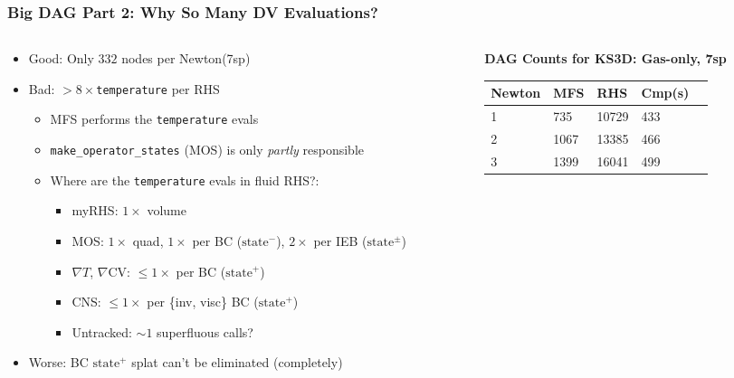 \begin{frame}\frametitle{Big DAG Part 2: Why So Many DV Evaluations?}
\begin{columns}[T, onlytextwidth] %
    \begin{column}{0.48\textwidth}
        \begin{itemize}
          \item Good: Only $332$ nodes per Newton(7sp)
          \item Bad: $>8\times$\texttt{temperature} per RHS
          \begin{itemize}
          \item MFS performs the \texttt{temperature} evals
          \item \texttt{make\_operator\_states} (MOS) is only \textit{partly} responsible
          \item Where are the \texttt{temperature} evals in fluid RHS?:
          \begin{itemize}
          \item myRHS: $1\times$ volume
          \item MOS: $1\times$ quad, $1\times$ per BC ($\text{state}^{-}$), $2\times$ per IEB ($\text{state}^{\pm}$)
          \item $\nabla{T}$, $\nabla{\text{CV}}$: $\le1\times$ per BC ($\text{state}^+$)
          \item CNS: $\le1\times$ per \{inv, visc\} BC ($\text{state}^+$)
          \item Untracked: $\sim1$ superfluous calls?
          \end{itemize}
          \end{itemize}
          \item Worse: BC $\text{state}^+$ splat can't be eliminated (completely)
        \end{itemize}
    \end{column}
    \begin{column}{0.48\textwidth}
        \vspace{40pt}
        \centering
        \textbf{DAG Counts for KS3D: Gas-only, 7sp}\\
        \vspace{3pt}
        \begin{tabularx}{\textwidth}{|X|X|X|X|X|}
            \hline
            \textbf{Newton} & \textbf{MFS} & \textbf{RHS} & \textbf{Cmp(s)} \\ \hline
            1 & 735 & 10729 & 433 \\ \hline
            2 & 1067 & 13385 & 466 \\ \hline
            3 & 1399 & 16041 & 499 \\ \hline
        \end{tabularx}        
    \end{column}
\end{columns}

\end{frame}

